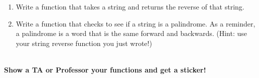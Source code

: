\documentclass[11pt, letterpaper, onecolumn, oneside, final]{article}
\begin{document}
\begin{enumerate}
\begin{enumerate}
\item Write a function that takes a string and returns the reverse of that string.\\

\item Write a function that checks to see if a string is a palindrome. As a reminder, a palindrome is a word that is the same forward and backwards. (Hint: use your string reverse function you just wrote!)\\\\
\end{enumerate} 
\textbf{Show a TA or Professor your functions and get a sticker!}
\end{enumerate}
\end{document}
